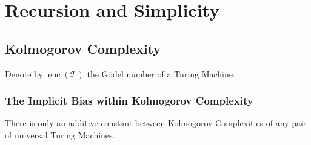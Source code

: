 

\chapter{Recursion and Simplicity}
\section{Kolmogorov Complexity}





Denote by $\operatorname{enc}(\mathcal{T})$ the G\"odel number of a Turing Machine.

\begin{definition}
	
\end{definition}


\subsection{The Implicit Bias within Kolmogorov Complexity}
\begin{theorem}
	There is only an additive constant between Kolmogorov Complexities of any pair of universal Turing Machines.
\end{theorem}

